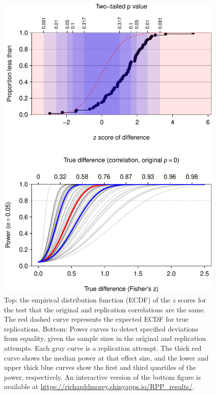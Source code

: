 \documentclass[doc,a4paper,floatsintext,draftfirst]{apa6}
\makeatletter
\def\maxwidth{ %
  \ifdim\Gin@nat@width>\linewidth
    \linewidth
  \else
    \Gin@nat@width
  \fi
}
\makeatother
\begin{document}
\begin{figure}
\includegraphics[width=.9\maxwidth]{figure/power1-1} \caption[Top]{Top: the empirical distribution function (ECDF) of the $z$ scores for the test that the original and replication correlations are the same. The red dashed curve represents the expected ECDF for true replications. Bottom: Power curves to detect specified deviations from equality, given the sample sizes in the original and replication attempts. Each gray curve is a replication attempt. The thick red curve shows the median power at that effect size, and the lower and upper thick blue curves show the first and third quartiles of the power, respectively. An interactive version of the bottom figure is available at \protect\url{https://richarddmorey.shinyapps.io/RPP_results/}.}\label{fig:power1}
\end{figure}
\end{document}
